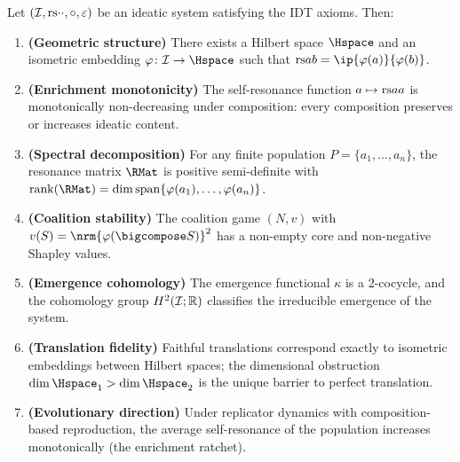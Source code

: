 \begin{theorem}
\label{thm:master-full}
Let $(\mathcal{I}, \mathrm{rs}{\cdot}{\cdot}, \circ, \varepsilon)$ be an ideatic system
satisfying the IDT axioms.  Then:
\begin{enumerate}
\item \textbf{(Geometric structure)} There exists a Hilbert space $\Hspace$ and
  an isometric embedding $\varphi\colon \IS \to \Hspace$ such that
  $\rs{a}{b} = \ip{\varphi(a)}{\varphi(b)}$.

\item \textbf{(Enrichment monotonicity)} The self-resonance function
  $a \mapsto \mathrm{rs}{a}{a}$ is monotonically non-decreasing under composition:
  every composition preserves or increases ideatic content.

\item \textbf{(Spectral decomposition)} For any finite population
  $P = \{a_1, \ldots, a_n\}$, the resonance matrix $\RMat$ is positive
  semi-definite with $\operatorname{rank}(\RMat) = \dim \operatorname{span}
  \{\varphi(a_1), \ldots, \varphi(a_n)\}$.

\item \textbf{(Coalition stability)} The coalition game $(N, v)$ with
  $v(S) = \nrm{\varphi(\bigcompose S)}^2$ has a non-empty core and
  non-negative Shapley values.

\item \textbf{(Emergence cohomology)} The emergence functional $\kappa$ is a
  2-cocycle, and the cohomology group $H^2(\mathcal{I}; \mathbb{R})$ classifies the
  irreducible emergence of the system.

\item \textbf{(Translation fidelity)} Faithful translations correspond
  exactly to isometric embeddings between Hilbert spaces; the dimensional
  obstruction $\dim \Hspace_1 > \dim \Hspace_2$ is the unique barrier to
  perfect translation.

\item \textbf{(Evolutionary direction)} Under replicator dynamics with
  composition-based reproduction, the average self-resonance of the
  population increases monotonically (the enrichment ratchet).
\end{enumerate}
\end{theorem}

